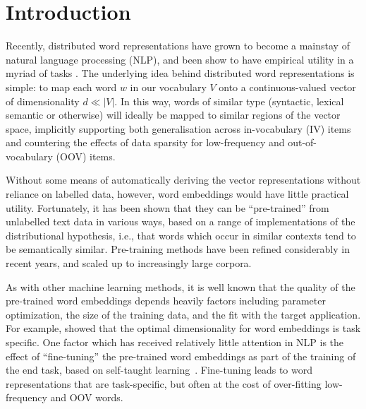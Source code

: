 \section{Introduction}

Recently, distributed word representations have grown to become a
mainstay of natural language processing (NLP), and been show to have
empirical utility in a myriad of tasks
\cite{Collobert2008,turian2010word,baroni:2014,Andreas:Klein:2014}.  The
underlying idea behind distributed word representations is simple: to
map each word $w$ in our vocabulary $V$ onto a continuous-valued vector
of dimensionality $d \ll |V|$.  In this way, words of similar type
(syntactic, lexical semantic or otherwise) will ideally be mapped to
similar regions of the vector space, implicitly supporting both
generalisation across in-vocabulary (IV) items and countering the
effects of data sparsity for low-frequency and out-of-vocabulary (OOV)
items.

Without some means of automatically deriving the vector representations
without reliance on labelled data, however, word embeddings would have
little practical utility. Fortunately, it has been shown that they can
be ``pre-trained'' from unlabelled text data in various ways, based on a
range of implementations of the distributional hypothesis, i.e., that
words which occur in similar contexts tend to be semantically
similar. Pre-training methods have been refined considerably in recent
years, and scaled up to increasingly large corpora.

As with other machine learning methods, it is well known that the
quality of the pre-trained word embeddings depends heavily factors
including parameter optimization, the size of the training data, and the
fit with the target application. For example, 
showed that the optimal dimensionality for word embeddings is task
specific.  One factor which has received relatively little attention in
NLP is the effect of ``fine-tuning'' the pre-trained word embeddings as
part of the training of the end task, based on self-taught
learning~\cite{raina2007self}.  Fine-tuning leads to word
representations that are task-specific, but often at the cost of
over-fitting low-frequency and OOV words.


